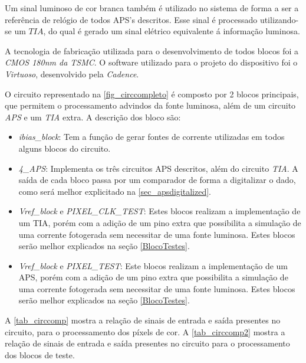 Um sinal luminoso de cor branca tamb\'em \'e utilizado no sistema de forma a ser a refer\^encia de rel\'ogio de todos APS's descritos. Esse sinal \'e processado utilizando-se um $TIA$, do qual \'e gerado um sinal el\'etrico equivalente \'a informa{\c c}\~ao luminosa.

A tecnologia de fabrica{\c c}\~ao utilizada para o desenvolvimento de todos blocos foi a \emph{CMOS 180nm da TSMC}. O software utilizado para o projeto do dispositivo foi o \emph{Virtuoso}, desenvolvido pela \emph{Cadence}.

O circuito representado na \autoref{fig_circcompleto} \'e composto por 2 blocos principais, que permitem o processamento advindos da fonte luminosa, al\'em de um circuito \emph{APS} e um \emph{TIA} extra. A descri{\c c}\~ao dos bloco s\~ao:

\begin{itemize}
    \item \emph{ibias\_block}: Tem a fun{\c c}\~ao de gerar fontes de corrente utilizadas em todos alguns blocos do circuito.
    
    \item \emph{4\_APS}: Implementa os tr\^es circuitos APS descritos, al\'em do circuito \emph{TIA}. A sa\'ida de cada bloco passa por um comparador de forma a digitalizar o dado, como ser\'a melhor explicitado na \autoref{sec_apsdigitalized}.
    
    \item \emph{Vref\_block} e \emph{PIXEL\_CLK\_TEST}: Estes blocos realizam a implementa{\c c}\~ao de um TIA, por\'em com a adi{\c c}\~ao de um pino extra que possibilita a simula{\c c}\~ao de uma corrente fotogerada sem necessitar de uma fonte luminosa. Estes blocos ser\~ao melhor explicados na se{\c c}\~ao \autoref{BlocoTestes}. 
    
    \item \emph{Vref\_block} e \emph{PIXEL\_TEST}: Este blocos realizam a implementa{\c c}\~ao de um APS, por\'em com a adi{\c c}\~ao de um pino extra que possibilita a simula{\c c}\~ao de uma corrente fotogerada sem necessitar de uma fonte luminosa. Estes blocos ser\~ao melhor explicados na se{\c c}\~ao \autoref{BlocoTestes}.
    
\end{itemize}

A \autoref{tab_circcomp} mostra a rela{\c c}\~ao de sinais de entrada e sa\'ida presentes no circuito, para o processamento dos p\'ixels de cor. A \autoref{tab_circcomp2} mostra a rela{\c c}\~ao de sinais de entrada e sa\'ida presentes no circuito para o processamento dos blocos de teste.

